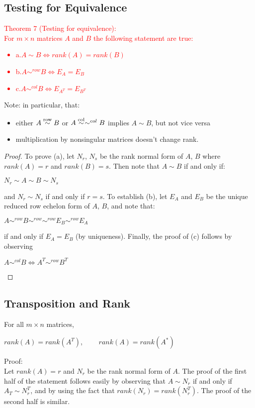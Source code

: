 \documentclass[UTF8,a4paper, 10pt, openany]{book}
\begin{document}
\subsection{Testing for Equivalence}
\textcolor{red}{Theorem 7 (Testing for equivalence):\\
For $m\times n$ matrices $A$ and $B$ the following statement are true:
\begin{itemize}
\item a.$A\sim B \iff rank(A) = rank(B)$ 
\item b.$A\sim^{row} B \iff E_A = E_B$
\item c.$A\sim^{col} B \iff E_{A^T} = E_{B^T}$
\end{itemize}}
Note: in particular, that:
\begin{itemize}
\item either $A \overset{\rm{row}}{\sim} B$ or $A \overset{\rm{col}}{\sim} \sim^{col} B$ implies $A\sim B$, but not vice versa
\item multiplication by nonsingular matrices doesn't change rank.  
\end{itemize}
\begin{proof}
To prove (a), let $N_r$, $N_s$ be the rank normal form of $A$, $B$ where $rank(A) =r$ and $rank(B)=s$. Then note that $A\sim B$ if and only if:
\begin{center}
$N_r\sim A\sim B\sim N_s$
\end{center}
and $N_r\sim N_s$ if and only if $r=s$. To establish (b), let $E_A$ and $E_B$ be the unique reduced row echelon form of $A$, $B$, and note that:
\begin{center}
$A\sim^{row}B\sim^{row}\sim^{row}E_B\sim^{row}E_A$
\end{center}
if and only if $E_A=E_B$ (by uniqueness). Finally, the proof of (c) follows by observing
\begin{center}
$A\sim^{col}B \iff A^T \sim^{row}B^T$
\end{center}
\end{proof}

\subsection{Transposition and Rank}
For all $m\times n$ matrices,
\begin{center}
$rank(A)=rank(A^T)$, $\qquad rank(A)=rank(A^*)$
\end{center}
Proof: \\
Let $rank(A)=r$ and $N_r$ be the rank normal form of $A$. The proof of the first half of the statement follows easily by observing that $A\sim N_r$ if and only if $A_T\sim N_r^T$, and by using the fact that $rank(N_r)=rank(N_r^T)$. The proof of the second half is similar. 
\end{document}
